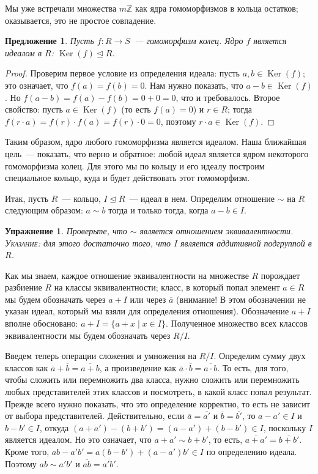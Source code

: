 \documentclass[a4paper,11pt]{scrartcl}
\theoremstyle{plain}
\newtheorem{proposition}[theorem]{Предложение}
\newtheorem{exercise}[theorem]{Упражнение}
\theoremstyle{definition}
\newcommand\mb{\mathbb}
\newcommand\trleq{\trianglelefteq}
\newcommand\Ker{\operatorname{Ker}}
\begin{document}
Мы уже встречали множества $m\mb Z$ как ядра гомоморфизмов в кольца
остатков; оказывается, это не простое совпадение.

\begin{proposition}
Пусть $f\colon R\to S$~--- гомоморфизм колец. Ядро $f$ является
идеалом в $R$: $\Ker(f)\trleq R$.
\end{proposition}
\begin{proof}
Проверим первое условие из определения идеала: пусть $a,b\in\Ker(f)$;
это означает, что
$f(a)=f(b)=0$. Нам нужно показать, 
что $a-b\in\Ker(f)$. Но $f(a-b)=f(a)-f(b)=0+0=0$, что и
требовалось. Второе свойство: пусть $a\in\Ker(f)$ (то есть $f(a)=0$) и
$r\in R$; тогда $f(r\cdot a)=f(r)\cdot f(a)=f(r)\cdot 0=0$, поэтому
$r\cdot a\in\Ker(f)$.
\end{proof}

Таким образом, ядро любого гомоморфизма является идеалом. Наша
ближайшая цель~--- показать, что верно и обратное: любой идеал
является ядром некоторого гомоморфизма колец. Для этого мы по кольцу и
его идеалу построим специальное кольцо, куда и будет действовать этот
гомоморфизм.

Итак, пусть $R$~--- кольцо, $I\trleq R$~--- идеал в нем. Определим
отношение $\sim$ на $R$ следующим образом: $a\sim b$ тогда и только
тогда, когда $a-b\in I$.
\begin{exercise}
Проверьте, что $\sim$ является отношением эквивалентности.
\textsc{Указание:} для этого достаточно того, что $I$ является аддитивной
подгруппой в $R$. 
\end{exercise}
Как мы знаем, каждое отношение эквивалентности на множестве $R$
порождает разбиение $R$ на классы эквивалентности; класс, в который
попал элемент $a\in R$ мы будем обозначать через $a+I$ или через
$\overline{a}$ (внимание! В этом обозначении не указан идеал,
который мы взяли для определения отношения). Обозначение $a+I$ вполне
обосновано: $a+I=\{a+x\mid x\in I\}$. Полученное множество всех классов
эквивалентности мы будем обозначать через $R/I$.

Введем теперь операции сложения и умножения на $R/I$. Определим сумму
двух классов как $\overline{a}+\overline{b}=\overline{a+b}$, а
произведение как $\overline{a}\cdot\overline{b}=\overline{a\cdot
  b}$. То есть, для того, чтобы сложить или перемножить два класса,
нужно сложить или перемножить любых представителей этих классов и
посмотреть, в какой класс попал результат. Прежде всего нужно
показать, что это определение корректно, то есть не зависит от выбора
представителей. Действительно, если $\overline{a}=\overline{a'}$ и
$\overline{b}=\overline{b'}$, то $a-a'\in I$ и $b-b'\in I$, откуда
$(a+a')-(b+b')=(a-a')+(b-b')\in I$, поскольку $I$ является идеалом. Но
это означает, что $a+a'\sim b+b'$, то есть,
$\overline{a+a'}=\overline{b+b'}$. Кроме того,
$ab-a'b'=a(b-b')+(a-a')b'\in I$ по определению идеала. Поэтому $ab\sim
a'b'$ и $\overline{ab}=\overline{a'b'}$.
\end{document}

